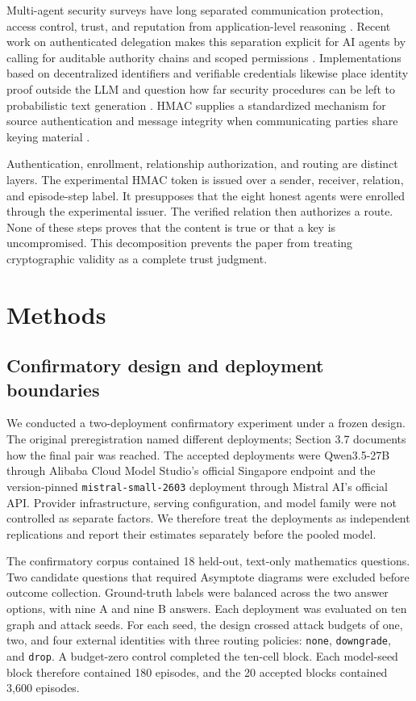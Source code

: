 \documentclass[11pt]{article}
\begin{document}
Multi-agent security surveys have long separated communication protection, access control, trust, and reputation from application-level reasoning \cite{jung2012security}. Recent work on authenticated delegation makes this separation explicit for AI agents by calling for auditable authority chains and scoped permissions \cite{south2025delegation}. Implementations based on decentralized identifiers and verifiable credentials likewise place identity proof outside the LLM and question how far security procedures can be left to probabilistic text generation \cite{garzon2026credentials}. HMAC supplies a standardized mechanism for source authentication and message integrity when communicating parties share keying material \cite{nist2008hmac}.

Authentication, enrollment, relationship authorization, and routing are distinct layers. The experimental HMAC token is issued over a sender, receiver, relation, and episode-step label. It presupposes that the eight honest agents were enrolled through the experimental issuer. The verified relation then authorizes a route. None of these steps proves that the content is true or that a key is uncompromised. This decomposition prevents the paper from treating cryptographic validity as a complete trust judgment.

\section{Methods}

\subsection{Confirmatory design and deployment boundaries}

We conducted a two-deployment confirmatory experiment under a frozen design. The original preregistration named different deployments; Section 3.7 documents how the final pair was reached. The accepted deployments were Qwen3.5-27B through Alibaba Cloud Model Studio's official Singapore endpoint and the version-pinned \texttt{mistral-small-2603} deployment through Mistral AI's official API. Provider infrastructure, serving configuration, and model family were not controlled as separate factors. We therefore treat the deployments as independent replications and report their estimates separately before the pooled model.

The confirmatory corpus contained 18 held-out, text-only mathematics questions. Two candidate questions that required Asymptote diagrams were excluded before outcome collection. Ground-truth labels were balanced across the two answer options, with nine A and nine B answers. Each deployment was evaluated on ten graph and attack seeds. For each seed, the design crossed attack budgets of one, two, and four external identities with three routing policies: \texttt{none}, \texttt{downgrade}, and \texttt{drop}. A budget-zero control completed the ten-cell block. Each model-seed block therefore contained 180 episodes, and the 20 accepted blocks contained 3,600 episodes.
\end{document}
